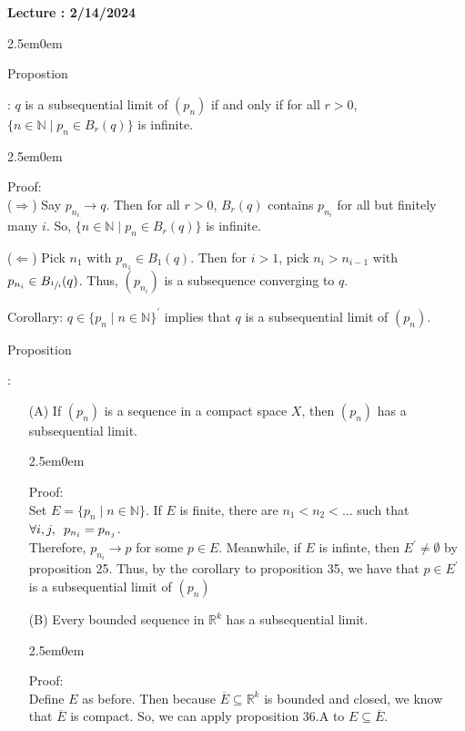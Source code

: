 \documentclass{book}
\newcommand{\hTwo}{%
   \color{MidnightBlue}%
   \fontsize{13}{15}\selectfont%
}
\newcommand{\hThree}{%
   \color{PineGreen}
   \fontsize{13}{15}\selectfont%
}
\newenvironment{myIndent}{%
   \begin{adjustwidth}{2.5em}{0em}%
}{%
   \end{adjustwidth}%
}
\newcommand{\retTwo}{\hfill\bigbreak}
\newcounter{LectureNumber}
\newcommand*{\markLecture}[1]{%
   \stepcounter{LectureNumber}%
   {\huge \color{Black} \textbf{Lecture \theLectureNumber: #1} \newline}%
}
\newcommand{\myHS}{ \hspace{0.5em}}
\newcounter{PropNumber}
\newcommand{\propCount}[1][1]{%
   \addtocounter{PropNumber}{#1}%
   \thePropNumber%
}
\begin{document}
   \markLecture{2/14/2024}

   {\begin{myIndent} \hTwo
      Propostion \propCount: $q$ is a subsequential limit of $(p_n)$ if and only if for all $r > 0$,\\ $\{n \in \mathbb{N} \mid p_n \in B_r(q)\}$ is infinite.
      
      {\begin{myIndent} \hThree
         Proof:\\
         ($\Longrightarrow$) Say $p_{n_i} \rightarrow q$. Then for all $r > 0$, $B_r(q)$ contains $p_{n_i}$ for all but finitely many $i$. So,
         $\{n \in \mathbb{N} \mid p_n \in B_r(q)\}$ is infinite. \retTwo

         ($\Longleftarrow$) Pick $n_1$ with $p_{n_1} \in B_1(q)$. Then for $i > 1$, pick $n_{i} > n_{i-1}$ with\\ $p_{n_i} \in B_{\sfrac{1}{i}}(q)$. Thus, $(p_{n_i})$ is a subsequence converging to $q$. \retTwo
      \end{myIndent}}

      Corollary: $q \in \{p_n \mid n \in \mathbb{N}\}^\prime$ implies that $q$ is a subsequential limit of $(p_n)$.

      \newpage

      Proposition \propCount:
      \begin{itemize}
         \item[(A)] If $(p_n)$ is a sequence in a compact space $X$, then $(p_n)$ has a subsequential limit.
         
         {\begin{myIndent} \hThree
            Proof:\\
            Set $E = \{p_n \mid n \in \mathbb{N}\}$. \retTwo
            If $E$ is finite, there are $n_1 < n_2 < \ldots$ such that $\forall i, j, \myHS p_{n_i} = p_{n_j}$.\\Therefore, $p_{n_i} \rightarrow p$ for some $p \in E$. \retTwo
            Meanwhile, if $E$ is infinte, then $E^\prime \neq \emptyset$ by proposition 25. Thus, by the corollary to proposition 35, we have that $p \in E^\prime$ is a subsequential limit of $(p_n)$
            \retTwo
         \end{myIndent}}
         
         \item[(B)] Every bounded sequence in $\mathbb{R}^k$ has a subsequential limit.
         
         {\begin{myIndent} \hThree
            Proof:\\
            Define $E$ as before. Then because $\overbar{E} \subseteq \mathbb{R}^k$ is bounded and closed, we know that $\overbar{E}$ is compact. So, we can apply proposition 36.A to $E \subseteq \overbar{E}$.
            \retTwo
         \end{myIndent}}
      \end{itemize}


\end{myIndent}}
\end{document}
